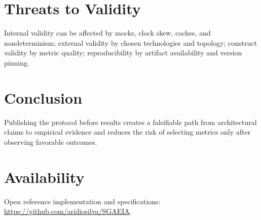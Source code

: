 \documentclass[11pt]{article}
\newcommand{\repo}{\url{https://github.com/aridiosilva/SGAEIA}}
\begin{document}
\section{Threats to Validity}
Internal validity can be affected by mocks, clock skew, caches, and nondeterminism; external validity by chosen technologies and topology; construct validity by metric quality; reproducibility by artifact availability and version pinning.

\section{Conclusion}
Publishing the protocol before results creates a falsifiable path from architectural claims to empirical evidence and reduces the risk of selecting metrics only after observing favorable outcomes.
\section*{Availability}
Open reference implementation and specifications: \repo.
\end{document}
